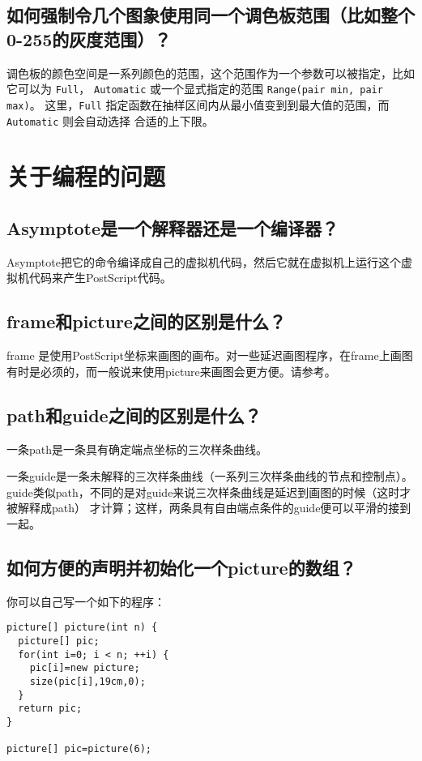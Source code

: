 \subsection{\label{Q6.20}如何强制令几个图象使用同一个调色板范围（比如整个0-255的灰度范围）？}
调色板的颜色空间是一系列颜色的范围，这个范围作为一个参数可以被指定，比如它可以为 \verb|Full|，
\verb|Automatic| 或一个显式指定的范围 \verb|Range(pair min, pair max)|。
这里，\verb|Full| 指定函数在抽样区间内从最小值变到到最大值的范围，而 \verb|Automatic| 则会自动选择
合适的上下限。

\section{\label{Q7}关于编程的问题}
\subsection{\label{Q7.1}Asymptote是一个解释器还是一个编译器？}
Asymptote把它的命令编译成自己的虚拟机代码，然后它就在虚拟机上运行这个虚拟机代码来产生PostScript代码。

\subsection{\label{Q7.2}frame和picture之间的区别是什么？}
frame 是使用PostScript坐标来画图的画布。对一些延迟画图程序，在frame上画图
有时是必须的，而一般说来使用picture来画图会更方便。请参考。


\subsection{\label{Q7.3}path和guide之间的区别是什么？}

一条path是一条具有确定端点坐标的三次样条曲线。

一条guide是一条未解释的三次样条曲线（一系列三次样条曲线的节点和控制点）。
guide类似path，不同的是对guide来说三次样条曲线是延迟到画图的时候（这时才被解释成path）
才计算；这样，两条具有自由端点条件的guide便可以平滑的接到一起。

\subsection{\label{Q7.4}如何方便的声明并初始化一个picture的数组？}
你可以自己写一个如下的程序：
\begin{lstlisting}
picture[] picture(int n) { 
  picture[] pic;
  for(int i=0; i < n; ++i) { 
    pic[i]=new picture;
    size(pic[i],19cm,0);
  } 
  return pic;
} 
 
picture[] pic=picture(6);
\end{lstlisting}

